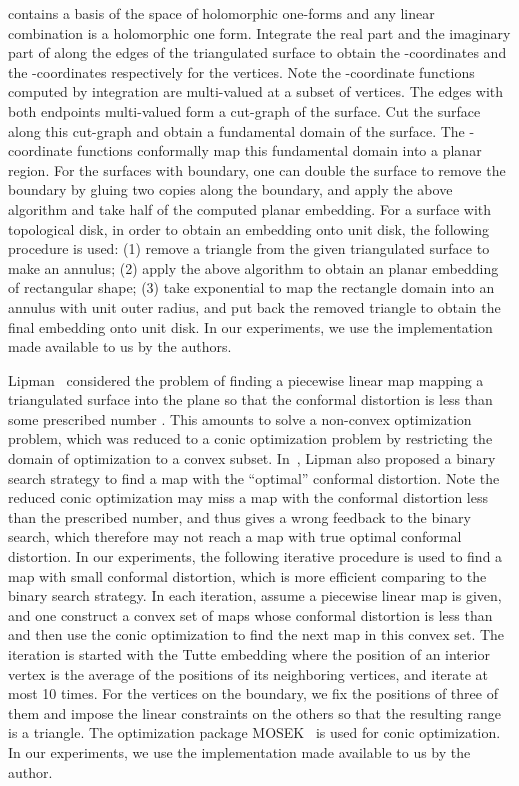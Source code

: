 \documentclass[11pt]{article}
\begin{document}
contains a basis of the space of holomorphic one-forms and any linear combination
 is a holomorphic one form. Integrate the real part 
and the imaginary part of  along the edges of the triangulated surface to
obtain the -coordinates and the -coordinates  respectively for the vertices. 
Note the -coordinate functions computed by integration are multi-valued 
at a subset of vertices. The edges with both endpoints multi-valued form a cut-graph 
of the surface. Cut the surface along this cut-graph and obtain a fundamental domain 
of the surface. The -coordinate functions conformally map this fundamental domain 
into a planar region. For the surfaces with boundary, one can double the surface to remove
the boundary by gluing two copies along the boundary, and apply the above algorithm and 
take half of the computed planar embedding. For a surface with topological disk, in order
to obtain an embedding onto unit disk, the following procedure is used: (1) remove a triangle
from the given triangulated surface to make an annulus; (2) apply the above algorithm to 
obtain an planar embedding of rectangular shape; (3) take exponential to map the rectangle domain
into an annulus with unit outer radius, and put back the removed triangle to obtain the final embedding
onto unit disk.  
In our experiments, we use the implementation made available to us by the authors. 


\vspace{0.1in}
Lipman~\cite{Lipman12} considered the problem of finding a piecewise linear map  mapping
a triangulated surface into the plane so that the conformal distortion  is less than 
some prescribed number . This amounts to solve a non-convex optimization problem, 
which was reduced to a conic optimization problem by restricting the domain of optimization
to a convex subset. In~\cite{Lipman12}, Lipman also proposed a binary search strategy to find
a map with the ``optimal'' conformal distortion. Note the reduced conic optimization may miss
a map with the conformal distortion less than the prescribed number, and thus gives a wrong 
feedback to the binary search, which therefore may not reach a map with true
optimal conformal distortion. In our experiments, the following iterative procedure is used to 
find a map with small conformal distortion, which is more efficient comparing to 
the binary search strategy. In each iteration, assume a piecewise linear map  is given,
and one construct a convex set of maps whose conformal distortion is less than 
 and then use the conic optimization to find the next map  
in this convex set.  The iteration is started with the Tutte embedding where the position 
of an interior vertex is the average of the positions of its neighboring vertices, and 
iterate at most 10 times. For the vertices on the boundary, we fix the positions of 
three of them and impose the linear constraints on the others so that the resulting 
range is a triangle. The optimization package MOSEK~\cite{mosek} is used for conic optimization. 
In our experiments, we use the implementation made available to us by the author. 
\end{document}
